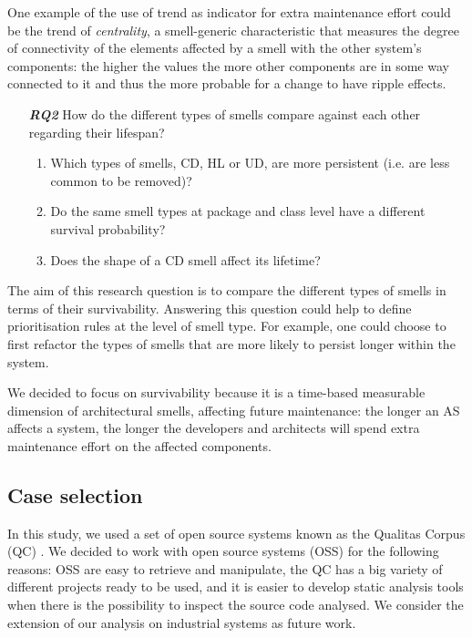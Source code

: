 One example of the use of trend as indicator for extra maintenance effort could be the trend of \emph{centrality}, a smell-generic characteristic that measures the degree of connectivity of the elements affected by a smell with the other system's components: the higher the values the more other components are in some way connected to it and thus the more probable for a change to have ripple effects.

\begin{enumerate}
    \item[\textbf{\textit{RQ2}}] How do the different types of smells compare against each other regarding their lifespan?
    \begin{enumerate}
        \item Which types of smells, CD, HL or UD, are more persistent (i.e. are less common to be removed)?
        \item Do the same smell types at package and class level have a different survival probability?
        \item Does the shape of a CD smell affect its lifetime?
    \end{enumerate}
\end{enumerate}
The aim of this research question is to compare the different types of smells in terms of their survivability. Answering this question could help to define prioritisation rules at the level of smell type.
For example, one could choose to first refactor the types of smells that are more likely to persist longer within the system.

We decided to focus on survivability because it is a time-based measurable dimension of architectural smells, affecting future maintenance: the longer an AS affects a system, the longer the developers and architects will spend extra maintenance effort on the affected components.

\subsection{Case selection}
In this study, we used a set of open source systems known as the Qualitas Corpus (QC) \cite{QualitasCorpus2010}.
We decided to work with open source systems (OSS) for the following reasons: OSS are easy to retrieve and manipulate, the QC has a big variety of different projects ready to be used, and it is easier to develop static analysis tools when there is the possibility to inspect the source code analysed. We consider the extension of our analysis on industrial systems as future work.

